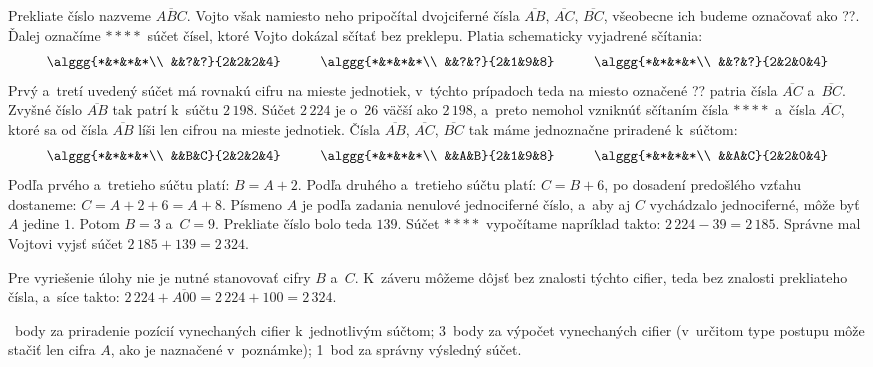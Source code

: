 {%
Prekliate číslo nazveme $\overline{ABC}$.
Vojto však namiesto neho pripočítal dvojciferné čísla $\overline{AB}$,
$\overline{AC}$, $\overline{BC}$, všeobecne ich budeme označovať ako ??.
Ďalej označíme $****$ súčet čísel, ktoré Vojto dokázal sčítať bez
preklepu.
Platia schematicky vyjadrené sčítania:
$$
\alggg{*&*&*&*\\ &&?&?}{2&2&2&4}\hskip1cm
\alggg{*&*&*&*\\ &&?&?}{2&1&9&8}\hskip1cm
\alggg{*&*&*&*\\ &&?&?}{2&2&0&4}
$$
Prvý a~tretí uvedený súčet má rovnakú cifru na mieste jednotiek, v~týchto
prípadoch teda na miesto označené ?? patria čísla $\overline{AC}$ a~$\overline{BC}$.
Zvyšné číslo $\overline{AB}$ tak patrí k~súčtu $2\,198$.
Súčet $2\,224$ je o~$26$ väčší ako $2\,198$, a~preto nemohol vzniknúť sčítaním
čísla $****$ a~čísla $\overline{AC}$, ktoré sa od čísla $\overline{AB}$ líši
len cifrou na mieste jednotiek.
Čísla $\overline{AB}$, $\overline{AC}$, $\overline{BC}$ tak máme jednoznačne
priradené k~súčtom:
$$
\alggg{*&*&*&*\\ &&B&C}{2&2&2&4}\hskip1cm
\alggg{*&*&*&*\\ &&A&B}{2&1&9&8}\hskip1cm
\alggg{*&*&*&*\\ &&A&C}{2&2&0&4}
$$
Podľa prvého a~tretieho súčtu platí: $B=A+2$.
Podľa druhého a~tretieho súčtu platí: $C=B+6$, po dosadení predošlého
vzťahu dostaneme: $C=A+2+6=A+8$.
Písmeno $A$ je podľa zadania nenulové jednociferné číslo, a~aby aj $C$ vychádzalo
jednociferné, môže byť $A$ jedine $1$.
Potom $B=3$ a~$C=9$.
Prekliate číslo bolo teda $139$.
Súčet $****$ vypočítame napríklad takto: $2\,224-39=2\,185$.
Správne mal Vojtovi vyjsť súčet $2\,185+139=2\,324$.

\poznamka
Pre vyriešenie úlohy nie je nutné stanovovať cifry $B$ a~$C$.
K~záveru môžeme dôjsť bez znalosti týchto cifier, teda bez znalosti
prekliateho čísla, a~síce takto: $2\,224+\overline{A00}= 2\,224+100=2\,324$.

~body za priradenie pozícií vynechaných cifier k~jednotlivým súčtom;
3~body za výpočet vynechaných cifier (v~určitom type postupu môže stačiť
len cifra $A$, ako je naznačené v~poznámke);
1~bod za správny výsledný súčet.
\endhodnotenie
}

